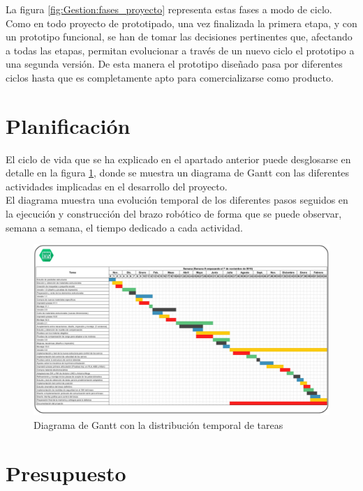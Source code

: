 La figura \ref{fig:Gestion:fases_proyecto} representa estas fases a modo de ciclo. Como en todo proyecto de prototipado, una vez finalizada la primera etapa, y con un prototipo funcional, se han de tomar las decisiones pertinentes que, afectando a todas las etapas, permitan evolucionar a través de un nuevo ciclo el prototipo a una segunda versión. De esta manera el prototipo diseñado pasa por diferentes ciclos hasta que es completamente apto para comercializarse como producto.

\section{Planificación}

El ciclo de vida que se ha explicado en el apartado anterior puede desglosarse en detalle en la figura \ref{fig:Gestion:gantt_tareas}, donde se muestra un diagrama de Gantt con las diferentes actividades implicadas en el desarrollo del proyecto.
\\

El diagrama muestra una evolución temporal de los diferentes pasos seguidos en la ejecución y construcción del brazo robótico de forma que se puede observar, semana a semana, el tiempo dedicado a cada actividad.
\begin{landscape}
   	\begin{figure}[H]
   		\centering
   		\includegraphics[width=1.6\textwidth]{figuras/Imagenes_Gestion/organizacion_gantt.jpg}
   		\caption{Diagrama de Gantt con la distribución temporal de tareas}
   		\label{fig:Gestion:gantt_tareas}
   	\end{figure}
\end{landscape}

\section{Presupuesto}

